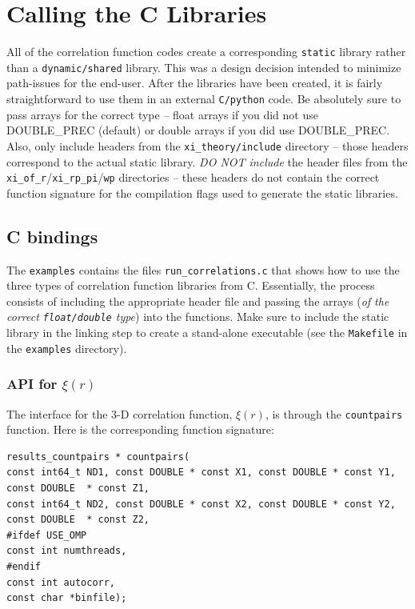 \documentclass[12pt,titlepage]{article}
\newcommand{\xir}{\ensuremath{{\xi(r)}}\xspace}
\begin{document}
\section{Calling the C Libraries}
All of the correlation function codes create a corresponding \texttt{static} library rather than a \texttt{dynamic/shared} library. This was a design decision intended 
to minimize path-issues for the end-user. After the libraries have been created, it is fairly straightforward to use them in an external \texttt{C/python} code.  
Be absolutely sure to pass arrays for the correct type -- float arrays if you did not use DOUBLE\_PREC (default) or double arrays if you did use DOUBLE\_PREC. 
Also, only include headers from the \texttt{xi\_theory/include} directory -- those headers correspond to the actual static library. {\em DO NOT include} 
the header files from the \texttt{xi\_of\_r}/\texttt{xi\_rp\_pi}/\texttt{wp} directories -- these headers do not contain the correct function signature for 
the compilation flags used to generate the static libraries. 

\subsection{C bindings}
The \texttt{examples} contains the files \texttt{run\_correlations.c} that shows how to use the three types of correlation function libraries from C. Essentially, the process 
consists of including the appropriate header file and passing the arrays ({\em of the correct \texttt{float/double} type}) into the functions. Make sure to include the static 
library in the linking step to create a stand-alone executable (see the \texttt{Makefile} in the \texttt{examples} directory). 

\subsubsection{API for \texorpdfstring{\xir}{xi(r)}}
The interface for the 3-D correlation function, \xir, is through the \texttt{countpairs} function. Here is 
the corresponding function signature:
\begin{lstlisting}[label={code:API_DD},caption={API for the 3-D \xir.}]
results_countpairs * countpairs(
const int64_t ND1, const DOUBLE * const X1, const DOUBLE * const Y1, const DOUBLE  * const Z1,
const int64_t ND2, const DOUBLE * const X2, const DOUBLE * const Y2, const DOUBLE  * const Z2,
#ifdef USE_OMP
const int numthreads,
#endif
const int autocorr,
const char *binfile);
\end{lstlisting}
\end{document}
